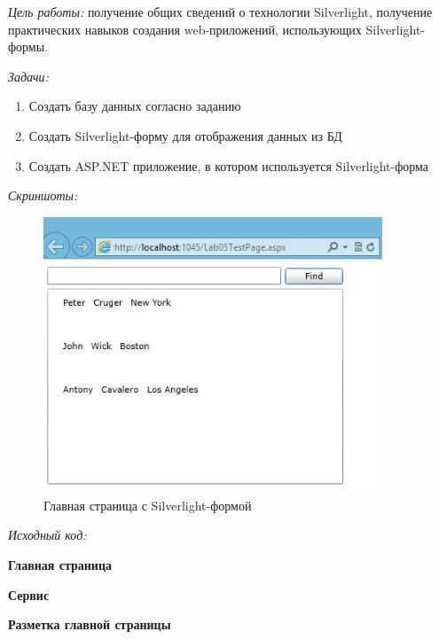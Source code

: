 \documentclass[pscyr, nonums]{hedlab}
\date{}
\begin{document}
    \makeheader
    \emph{Цель работы:} получение общих сведений о технологии Silverlight, получение практических навыков создания web-приложений, использующих 
    Silverlight-формы.

    \emph{Задачи:}
    \begin{enumerate}\itemsep-5pt
        \item Создать базу данных согласно заданию
        \item Создать Silverlight-форму для отображения данных из БД
        \item Создать ASP.NET приложение, в котором используется Silverlight-форма
    \end{enumerate}

    \emph{Скриншоты:}
    \begin{figure}[ht]
        \center
        \includegraphics[width=0.9\textwidth]{Lab05_01}
        \caption{Главная страница с Silverlight-формой}
    \end{figure}

    \pagebreak

    \emph{Исходный код:}
    \begin{center}
        \textbf{Главная страница}
    \end{center}
    

    \begin{center}
        \textbf{Сервис}
    \end{center}
    

    \begin{center}
        \textbf{Разметка главной страницы}
    \end{center}
    
\end{document}
